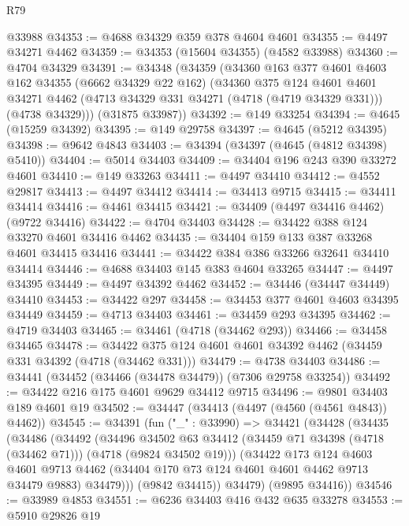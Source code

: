 \begin{lexlean}{R79}
\begin{coremodule}
    @33988
@34353 := @4688 @34329 @359 @378 @4604 @4601
@34355 := @4497 @34271 @4462
@34359 := @34353 (@15604 @34355) (@4582 @33988)
@34360 := @4704 @34329
@34391 := @34348
    (@34359
      (@34360
        @163
        @377
        @4601
        @4603
        @162
        @34355
        (@6662 @34329 @22 @162)
        (@34360
          @375
          @124
          @4601
          @4601
          @34271
          @4462
          (@4713 @34329 @331 @34271 (@4718 (@4719 @34329 @331)))
          (@4738 @34329)))
      (@31875 @33987))
@34392 := @149 @33254
@34394 := @4645 (@15259 @34392)
@34395 := @149 @29758
@34397 := @4645 (@5212 @34395)
@34398 := @9642 @4843
@34403 := @34394 (@34397 (@4645 (@4812 @34398) @5410))
@34404 := @5014 @34403
@34409 := @34404 @196 @243 @390 @33272 @4601
@34410 := @149 @33263
@34411 := @4497 @34410
@34412 := @4552 @29817
@34413 := @4497 @34412
@34414 := @34413 @9715
@34415 := @34411 @34414
@34416 := @4461 @34415
@34421 := @34409 (@4497 @34416 @4462) (@9722 @34416)
@34422 := @4704 @34403
@34428 := @34422 @388 @124 @33270 @4601 @34416 @4462
@34435 := @34404 @159 @133 @387 @33268 @4601 @34415 @34416
@34441 := @34422 @384 @386 @33266 @32641 @34410 @34414
@34446 := @4688 @34403 @145 @383 @4604 @33265
@34447 := @4497 @34395
@34449 := @4497 @34392 @4462
@34452 := @34446 (@34447 @34449) @34410
@34453 := @34422 @297
@34458 := @34453 @377 @4601 @4603 @34395 @34449
@34459 := @4713 @34403
@34461 := @34459 @293 @34395
@34462 := @4719 @34403
@34465 := @34461 (@4718 (@34462 @293))
@34466 := @34458 @34465
@34478 := @34422 @375 @124 @4601 @4601 @34392 @4462 (@34459 @331 @34392 (@4718 (@34462 @331)))
@34479 := @4738 @34403
@34486 := @34441 (@34452 (@34466 (@34478 @34479)) (@7306 @29758 @33254))
@34492 := @34422 @216 @175 @4601 @9629 @34412 @9715
@34496 := @9801 @34403 @189 @4601 @19
@34502 := @34447 (@34413 (@4497 (@4560 (@4561 @4843)) @4462))
@34545 := @34391
    (fun ("_" : @33990) =>
    @34421
      (@34428
        (@34435
          (@34486
            (@34492
              (@34496
                @34502
                @63
                @34412
                (@34459 @71 @34398 (@4718 (@34462 @71)))
                (@4718 (@9824 @34502 @19)))
              (@34422
                @173
                @124
                @4603
                @4601
                @9713
                @4462
                (@34404 @170 @73 @124 @4601 @4601 @4462 @9713 @34479 @9883)
                @34479)))
          (@9842 @34415))
        @34479)
      (@9895 @34416))
@34546 := @33989 @4853
@34551 := @6236 @34403 @416 @432 @635 @33278
@34553 := @5910 @29826 @19

\end{coremodule}
\end{lexlean}
